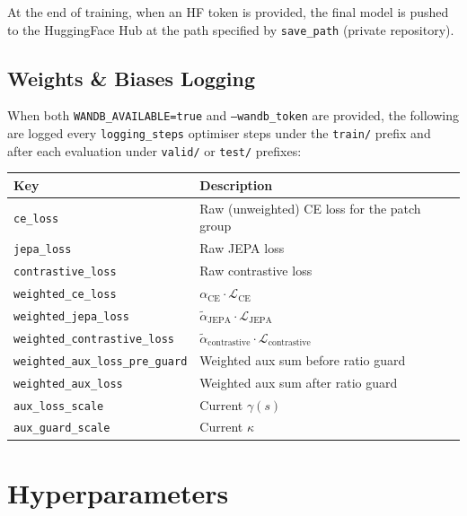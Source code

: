 \documentclass[11pt,a4paper]{article}
\begin{document}
At the end of training, when an HF token is provided, the final model is pushed to the HuggingFace
Hub at the path specified by \texttt{save\_path} (private repository).

\subsection{Weights \& Biases Logging}

When both \texttt{WANDB\_AVAILABLE=true} and \texttt{--wandb\_token} are provided, the following
are logged every \texttt{logging\_steps} optimiser steps under the \texttt{train/} prefix and after
each evaluation under \texttt{valid/} or \texttt{test/} prefixes:

\begin{center}
\begin{tabular}{ll}
\toprule
\textbf{Key} & \textbf{Description} \\
\midrule
\texttt{ce\_loss} & Raw (unweighted) CE loss for the patch group \\
\texttt{jepa\_loss} & Raw JEPA loss \\
\texttt{contrastive\_loss} & Raw contrastive loss \\
\texttt{weighted\_ce\_loss} & $\alpha_{\mathrm{CE}} \cdot \mathcal{L}_{\mathrm{CE}}$ \\
\texttt{weighted\_jepa\_loss} & $\tilde\alpha_{\mathrm{JEPA}} \cdot \mathcal{L}_{\mathrm{JEPA}}$ \\
\texttt{weighted\_contrastive\_loss} & $\tilde\alpha_{\mathrm{contrastive}} \cdot \mathcal{L}_{\mathrm{contrastive}}$ \\
\texttt{weighted\_aux\_loss\_pre\_guard} & Weighted aux sum before ratio guard \\
\texttt{weighted\_aux\_loss} & Weighted aux sum after ratio guard \\
\texttt{aux\_loss\_scale} & Current $\gamma(s)$ \\
\texttt{aux\_guard\_scale} & Current $\kappa$ \\
\bottomrule
\end{tabular}
\end{center}

\section{Hyperparameters}
\end{document}
